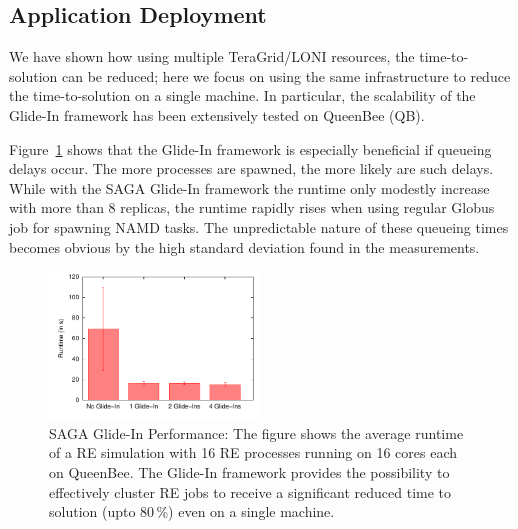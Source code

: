 \documentclass[conference,final]{IEEEtran}
\newcommand{\up}{\vspace*{-1em}}
\begin{document}
\up

\subsection{Application Deployment}

\up


We have shown how using multiple TeraGrid/LONI resources, the
time-to-solution can be reduced; here we focus on using the same
infrastructure to reduce the time-to-solution on a single machine.  In
particular, the scalability of the Glide-In framework has been
extensively tested on QueenBee (QB).

Figure~\ref{fig:perf_remd_glidin} shows that the Glide-In framework is
especially beneficial if queueing delays occur. The more processes are
spawned, the more likely are such delays. While with the SAGA Glide-In
framework the runtime only modestly increase with more than 8
replicas, the runtime rapidly rises when using regular Globus job for
spawning NAMD tasks. The unpredictable nature of these queueing times
becomes obvious by the high standard deviation found in the
measurements.


\begin{figure}[htbp]
        \includegraphics[width=0.5\textwidth]{perf_glidein.pdf}
        \caption{SAGA Glide-In Performance: The figure shows the
          average runtime of a RE simulation with 16 RE processes
          running on 16 cores each on QueenBee.  The Glide-In
          framework provides the possibility to effectively cluster RE
          jobs to receive a significant reduced time to solution (upto
          80\,\%) even on a single machine.}
    \label{fig:perf_remd_glidin}
\end{figure}
\end{document}
